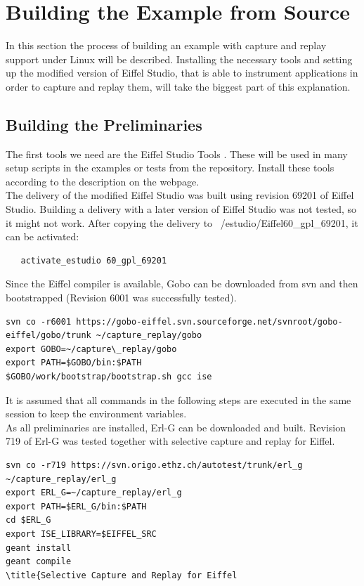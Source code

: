 \section{Building the Example from Source}
\sloppy %
In this section the process of building an example with capture and replay support under Linux will be described. Installing the necessary tools and setting up the modified version of Eiffel Studio, that is able to instrument applications in order to capture and replay them, will take the biggest part of this explanation.\\


\subsection{Building the Preliminaries}
The first tools we need are the  Eiffel Studio Tools \cite{estudiotools}. These will be used in many setup scripts in the examples or tests from the repository. Install these tools according to the description on the webpage.\\

The delivery of the modified Eiffel Studio was built using revision 69201 of Eiffel Studio. Building a delivery with a later version of Eiffel Studio was not tested, so it might not work. After copying the delivery to ~/estudio/Eiffel60\_gpl\_69201, it can be activated:
\bashlisting
\begin{lstlisting}
   activate_estudio 60_gpl_69201
\end{lstlisting}

Since the Eiffel compiler is available, Gobo \cite{gobo} can be downloaded from svn and then bootstrapped (Revision 6001 was successfully tested).
\begin{lstlisting}
svn co -r6001 https://gobo-eiffel.svn.sourceforge.net/svnroot/gobo-eiffel/gobo/trunk ~/capture_replay/gobo
export GOBO=~/capture\_replay/gobo
export PATH=$GOBO/bin:$PATH
$GOBO/work/bootstrap/bootstrap.sh gcc ise
\end{lstlisting}

It is assumed that all commands in the following steps are executed in the same session to keep the environment variables.\\
As all preliminaries are installed, Erl-G \cite{erlg} can be downloaded and built. Revision 719 of Erl-G was tested together with selective capture and replay for Eiffel.
\begin{lstlisting}
svn co -r719 https://svn.origo.ethz.ch/autotest/trunk/erl_g ~/capture_replay/erl_g
export ERL_G=~/capture_replay/erl_g
export PATH=$ERL_G/bin:$PATH
cd $ERL_G
export ISE_LIBRARY=$EIFFEL_SRC
geant install
geant compile
\title{Selective Capture and Replay for Eiffel
\end{lstlisting}

